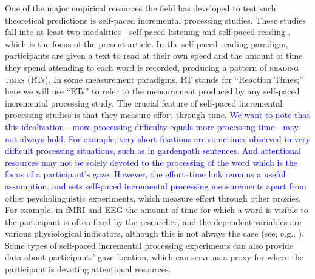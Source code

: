 \documentclass[12pt]{article}
\newcommand{\defn}[1]{\textsc{#1}}
\newcommand{\change}[1]{\textcolor{blue}{#1}}
\begin{document}
One of the major empirical resources the field has developed to test such theoretical predictions is self-paced incremental processing studies. These studies fall into at least two modalities---self-paced listening \citep{ferreira1996effects, papadopoulou2013self} and self-paced reading \citep{just1982paradigms}, which is the focus of the present article. In the self-paced reading paradigm, participants are given a text to read at their own speed and the amount of time they spend attending to each word is recorded, producing a pattern of \defn{reading times} (RTs). In some measurement paradigms, RT stands for ``Reaction Times;'' here we will use ``RTs'' to refer to the measurement produced by any self-paced incremental processing study. 
The crucial feature of self-paced incremental processing studies is that they measure effort through time. \change{We want to note that this idealization---more processing difficulty equals more processing time---may not always hold. For example, very short fixations are sometimes observed in very difficult processing situations, such as in gardenpath sentences. And attentional resources may not be solely devoted to the processing of the word which is the focus of a participant's gaze. However, the effort--time link remains a useful assumption, and sets self-paced incremental processing measurements apart from} other psycholinguistic experiments, which measure effort through other proxies. For example, in fMRI and EEG the amount of time for which a word is visible to the participant is often fixed by the researcher, and the dependent variables are various physiological indicators, although this is not always the case (see, e.g., \citealt{kretzschmar2009parafoveal, dimigen2011coregistration, metzner2015brain, metzner2017importance}). Some types of self-paced incremental processing experiments can also provide data about participants' gaze location, which can serve as a proxy for where the participant is devoting attentional resources.

\end{document}
